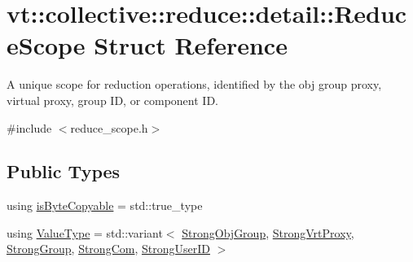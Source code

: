 \hypertarget{structvt_1_1collective_1_1reduce_1_1detail_1_1_reduce_scope}{}\section{vt\+:\+:collective\+:\+:reduce\+:\+:detail\+:\+:Reduce\+Scope Struct Reference}
\label{structvt_1_1collective_1_1reduce_1_1detail_1_1_reduce_scope}


A unique scope for reduction operations, identified by the obj group proxy, virtual proxy, group ID, or component ID.  




{\ttfamily \#include $<$reduce\+\_\+scope.\+h$>$}

\subsection*{Public Types}
\begin{DoxyCompactItemize}
\item 
using \hyperlink{structvt_1_1collective_1_1reduce_1_1detail_1_1_reduce_scope_ae92eccdf7219bb939ab3a35af7f53d47}{is\+Byte\+Copyable} = std\+::true\+\_\+type
\item 
using \hyperlink{structvt_1_1collective_1_1reduce_1_1detail_1_1_reduce_scope_aac14cd07e9678d96b761d90aa1ed3bb0}{Value\+Type} = std\+::variant$<$ \hyperlink{namespacevt_1_1collective_1_1reduce_1_1detail_afd4940b3a4ac2ef740f0e3844a09dd08}{Strong\+Obj\+Group}, \hyperlink{namespacevt_1_1collective_1_1reduce_1_1detail_a492943cffff6d1a92386468d46f589df}{Strong\+Vrt\+Proxy}, \hyperlink{namespacevt_1_1collective_1_1reduce_1_1detail_adcad97800459415ff6ea4b5feb90e0f2}{Strong\+Group}, \hyperlink{namespacevt_1_1collective_1_1reduce_1_1detail_a6ea2d8e8f8ba226a6e704a9041aebaec}{Strong\+Com}, \hyperlink{namespacevt_1_1collective_1_1reduce_1_1detail_af9e42b20d1be7dccc1b5e587f0387e02}{Strong\+User\+ID} $>$
\end{DoxyCompactItemize}
